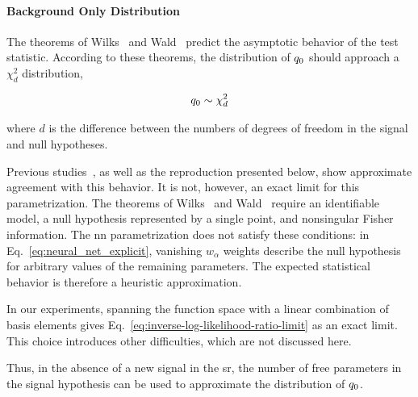 \documentclass[paper/ddppaper2.tex]{subfiles}
\begin{document}
\paragraph{Background Only Distribution}
\label{sec:Wilks_Wald}

The theorems of Wilks~\cite{Wilks_Original} and Wald~\cite{Wald_Original} predict the asymptotic behavior of the test statistic. According to these theorems, the distribution of ${q_{0}}$ should approach a $\chi^2_d$ distribution,

\begin{equation}
\label{eq:inverse-log-likelihood-ratio-limit}
    \invllratio \sim \chi^2_{d}
\end{equation}

\noindent where $d$ is the difference between the numbers of degrees of freedom in the signal and null hypotheses.

Previous studies~\cite{LastDDPPaper, Italian_no_2_Learning_New_Physics_from_an_Imperfect_Machine}, as well as the reproduction presented below, show approximate agreement with this behavior. It is not, however, an exact limit for this parametrization. The theorems of Wilks~\cite{Wilks_Original} and Wald~\cite{Wald_Original} require an identifiable model, a null hypothesis represented by a single point, and nonsingular Fisher information. The \gls{nn} parametrization does not satisfy these conditions: in Eq.~\ref{eq:neural_net_explicit}, vanishing $w_\alpha$ weights describe the null hypothesis for arbitrary values of the remaining parameters. The expected statistical behavior is therefore a heuristic approximation.

In our experiments, spanning the function space with a linear combination of basis elements gives Eq.~\ref{eq:inverse-log-likelihood-ratio-limit} as an exact limit. This choice introduces other difficulties, which are not discussed here.

Thus, in the absence of a new signal in the \gls{sr}, the number of free parameters in the signal hypothesis can be used to approximate the distribution of ${q_{0}}$.
\end{document}
